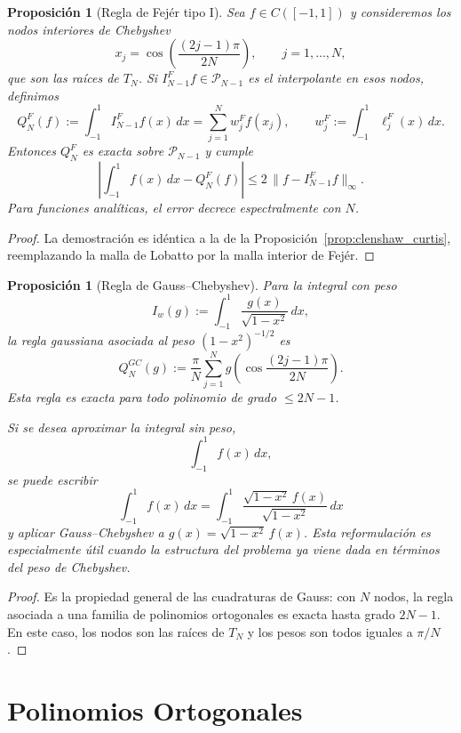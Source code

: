 \documentclass[a4paper,11pt]{report}
\newtheorem{proposition}[theorem]{Proposición}
\begin{document}
\begin{proposition}[Regla de Fej\'er tipo I]\label{prop:fejer_tipo_1}
Sea $f\in C([-1,1])$ y consideremos los nodos interiores de Chebyshev
\[
x_j=\cos\!\left(\frac{(2j-1)\pi}{2N}\right),\qquad j=1,\dots,N,
\]
que son las raíces de $T_N$. Si $I_{N-1}^{F}f\in\mathcal P_{N-1}$ es el interpolante en esos nodos, definimos
\[
Q_N^{F}(f):=\int_{-1}^1 I_{N-1}^{F}f(x)\,dx=\sum_{j=1}^N w_j^{F}f(x_j),
\qquad
w_j^{F}:=\int_{-1}^1\ell_j^{F}(x)\,dx.
\]
Entonces $Q_N^{F}$ es exacta sobre $\mathcal P_{N-1}$ y cumple
\[
\left|\int_{-1}^1 f(x)\,dx-Q_N^{F}(f)\right|\le 2\,\|f-I_{N-1}^{F}f\|_\infty.
\]
Para funciones analíticas, el error decrece espectralmente con $N$.
\end{proposition}

\begin{proof}
La demostración es idéntica a la de la Proposición~\ref{prop:clenshaw_curtis}, reemplazando la malla de Lobatto por la malla interior de Fej\'er.
\end{proof}

\begin{proposition}[Regla de Gauss--Chebyshev]\label{prop:gauss_chebyshev}
Para la integral con peso
\[
I_w(g):=\int_{-1}^1\frac{g(x)}{\sqrt{1-x^2}}\,dx,
\]
la regla gaussiana asociada al peso $(1-x^2)^{-1/2}$ es
\[
Q_N^{GC}(g):=\frac{\pi}{N}\sum_{j=1}^N g\!\left(\cos\!\frac{(2j-1)\pi}{2N}\right).
\]
Esta regla es exacta para todo polinomio de grado $\le 2N-1$.

Si se desea aproximar la integral sin peso,
\[
\int_{-1}^1 f(x)\,dx,
\]
se puede escribir
\[
\int_{-1}^1 f(x)\,dx=\int_{-1}^1\frac{\sqrt{1-x^2}\,f(x)}{\sqrt{1-x^2}}\,dx
\]
y aplicar Gauss--Chebyshev a $g(x)=\sqrt{1-x^2}\,f(x)$. Esta reformulación es especialmente útil cuando la estructura del problema ya viene dada en términos del peso de Chebyshev.
\end{proposition}

\begin{proof}
Es la propiedad general de las cuadraturas de Gauss: con $N$ nodos, la regla asociada a una familia de polinomios ortogonales es exacta hasta grado $2N-1$. En este caso, los nodos son las raíces de $T_N$ y los pesos son todos iguales a $\pi/N$.
\end{proof}


\section{Polinomios Ortogonales}
\end{document}

